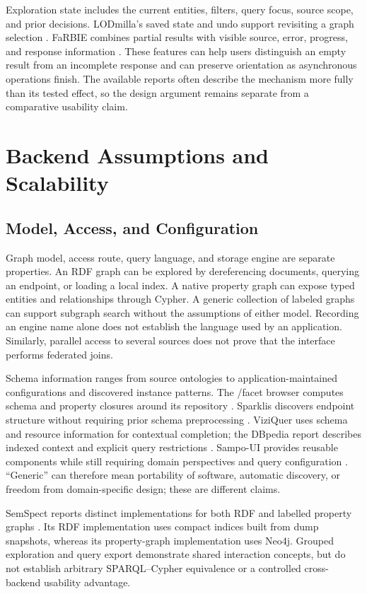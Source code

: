 \documentclass[manuscript,review,screen]{acmart}
\begin{document}
Exploration state includes the current entities, filters, query focus, source scope, and prior decisions. LODmilla's saved state and undo support revisiting a graph selection \citep{2014_AMA_LODmilla_Shared}. FaRBIE combines partial results with visible source, error, progress, and response information \citep{V3-01117}. These features can help users distinguish an empty result from an incomplete response and can preserve orientation as asynchronous operations finish. The available reports often describe the mechanism more fully than its tested effect, so the design argument remains separate from a comparative usability claim.

\section{Backend Assumptions and Scalability}
\subsection{Model, Access, and Configuration}
Graph model, access route, query language, and storage engine are separate properties. An RDF graph can be explored by dereferencing documents, querying an endpoint, or loading a local index. A native property graph can expose typed entities and relationships through Cypher. A generic collection of labeled graphs can support subgraph search without the assumptions of either model. Recording an engine name alone does not establish the language used by an application. Similarly, parallel access to several sources does not prove that the interface performs federated joins.

Schema information ranges from source ontologies to application-maintained configurations and discovered instance patterns. The /facet browser computes schema and property closures around its repository \citep{2006_Hildebrand_facet_A}. Sparklis discovers endpoint structure without requiring prior schema preprocessing \citep{2017_Ferre_Sparklis_An}. ViziQuer uses schema and resource information for contextual completion; the DBpedia report describes indexed context and explicit query restrictions \citep{V3-01013}. Sampo-UI provides reusable components while still requiring domain perspectives and query configuration \citep{2022_Ikkala_Sampo-UI_A}. ``Generic'' can therefore mean portability of software, automatic discovery, or freedom from domain-specific design; these are different claims.

SemSpect reports distinct implementations for both RDF and labelled property graphs \citep{V3-02383}. Its RDF implementation uses compact indices built from dump snapshots, whereas its property-graph implementation uses Neo4j. Grouped exploration and query export demonstrate shared interaction concepts, but do not establish arbitrary SPARQL--Cypher equivalence or a controlled cross-backend usability advantage.
\end{document}
